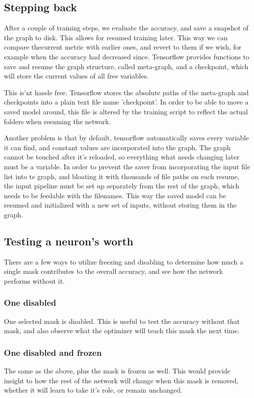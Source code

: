 \documentclass[12pt]{report}
\begin{document}
\subsection{Stepping back}
After a couple of training steps, we evaluate the accuracy, and save a snapshot of the graph to disk. This allows for resumed training later. This way we can compare thecurrent metric with earlier ones, and revert to them if we wish, for example when the accuracy had decreased since. Tensorflow provides functions to save and resume the graph structure, called meta-graph, and a checkpoint, which will store the current values of all free variables.\par
This is'nt hassle free. Tensorflow stores the absolute paths of the meta-graph and checkpoints into a plain text file name 'checkpoint'. In order to be able to move a saved model around, this file is altered by the training script to reflect the actual folders when resuming the network.\par
Another problem is that by default, tensorflow automatically saves every variable it can find, and constant values are incorporated into the graph. The graph cannot be touched after it's reloaded, so everything what needs changing later must be a variable. In order to prevent the saver from incorporating the input file list into te graph, and bloating it with thousands of file paths on each resume, the input pipeline must be set up separately from the rest of the graph, which needs to be feedable with the filenames. This way the saved model can be resumed and initialized with a new set of inputs, without storing them in the graph.
\subsection{Testing a neuron's worth}
There are a few ways to utilize freezing and disabling to determine how much a single mask contributes to the overall accuracy, and see how the network performs without it.
\subsubsection{One disabled}One selected mask is disabled. This is useful to test the accuracy without that mask, and also observe what the optimizer will teach this mask the next time.
\subsubsection{One disabled and frozen}The same as the above, plus the mask is frozen as well. This would provide insight to how the rest of the network will change when this mask is removed, whether it will learn to take it's role, or remain unchanged.
\end{document}
